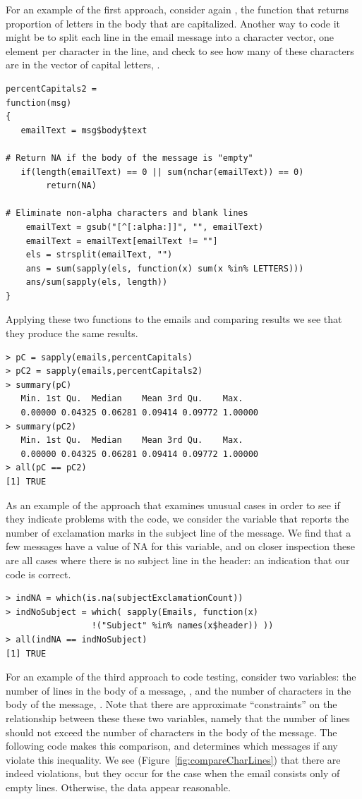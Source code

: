 For an example of the first approach, consider again 
, the function that returns
proportion of letters in the body that are capitalized.
Another way to code it might be to split each line in the
email message into a character vector, one element per
character in the line, and check to see how many of these 
characters are in the vector of capital letters, .

{\footnotesize{
\begin{verbatim}
percentCapitals2 =
function(msg)
{
   emailText = msg$body$text

# Return NA if the body of the message is "empty"
   if(length(emailText) == 0 || sum(nchar(emailText)) == 0)
        return(NA)

# Eliminate non-alpha characters and blank lines 
    emailText = gsub("[^[:alpha:]]", "", emailText)
    emailText = emailText[emailText != ""]
    els = strsplit(emailText, "")
    ans = sum(sapply(els, function(x) sum(x %in% LETTERS)))
    ans/sum(sapply(els, length))
}
\end{verbatim}
}}

Applying these two functions to the emails and comparing
results we see that they produce the same results.

\begin{verbatim}
> pC = sapply(emails,percentCapitals)
> pC2 = sapply(emails,percentCapitals2)
> summary(pC)
   Min. 1st Qu.  Median    Mean 3rd Qu.    Max.
   0.00000 0.04325 0.06281 0.09414 0.09772 1.00000
> summary(pC2)
   Min. 1st Qu.  Median    Mean 3rd Qu.    Max.
   0.00000 0.04325 0.06281 0.09414 0.09772 1.00000
> all(pC == pC2)
[1] TRUE
\end{verbatim}
As an example of the approach that examines unusual cases in order
to see if they indicate problems with the code, we consider the 
variable that reports the number of exclamation marks in the 
subject line of the message. We find that a few messages have 
a value of NA for this variable, and on closer inspection
these are all cases where there is no subject line in the header:
an indication that our code is correct. 

\begin{verbatim}
> indNA = which(is.na(subjectExclamationCount))
> indNoSubject = which( sapply(Emails, function(x) 
                 !("Subject" %in% names(x$header)) ))
> all(indNA == indNoSubject)
[1] TRUE
\end{verbatim}

For an example of the third approach to code testing, consider
two variables: the number of lines in the body of 
a message, , and
the number of characters in the body of the message,
.
Note that there are approximate ``constraints'' on the relationship
between these these two variables, namely that 
the number of lines should not exceed the number of 
characters in the body of the message.
The following code makes this comparison, and determines which 
messages if any violate this inequality.
We see (Figure~\ref{fig:compareCharLines}) that there are indeed 
violations, but they occur for the case when the email consists
only of empty lines. Otherwise, the data appear reasonable.

